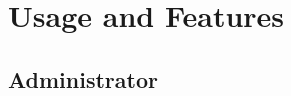 \documentclass[12pt]{article}
\begin{document}
% 
% 

\section{Usage and Features}
\subsection{Administrator}
\end{document}
